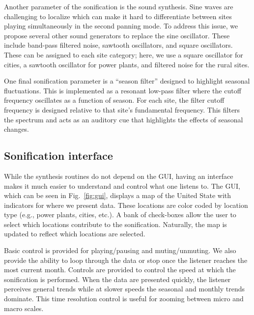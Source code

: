 \documentclass[a4paper,10pt,oneside]{article}
\newcommand{\ce}[1]{$\mathrm{#1}$}
\begin{document}
\begin{sloppy}
Another parameter of the sonification is the sound synthesis. Sine waves are challenging to localize which can make it hard to differentiate between sites playing simultaneously in the second panning mode. To address this issue, we propose several other sound generators to replace the sine oscillator. These include band-pass filtered noise, sawtooth oscillators, and square oscillators. These can be assigned to each site category; here, we use a square oscillator for cities, a sawtooth oscillator for power plants, and filtered noise for the rural sites. 

One final sonification parameter is a ``season filter'' designed to highlight seasonal fluctuations. This is implemented as a resonant low-pass filter where the cutoff frequency oscillates as a function of season. For each site, the filter cutoff frequency is designed relative to that site's fundamental frequency.  This filters the spectrum and acts as an auditory cue that highlights the effects of seasonal changes. 






\subsection{Sonification interface}

While the synthesis routines do not depend on the GUI, having an interface makes it much easier to understand and control what one listens to. The GUI, which can be seen in Fig.~\ref{fig:gui}, displays a map of the United State with indicators for where we present data.  These locations are color coded by location type (e.g., power plants, cities, etc.). A bank of check-boxes allow the user to select which locations contribute to the sonification. Naturally, the map is updated to reflect which locations are selected.  


Basic control is provided for playing/pausing and muting/unmuting. We also provide the ability to loop through the data or stop once the listener reaches the most current month.  Controls are provided to control the speed at which the sonification is performed.  When the data are presented quickly, the listener perceives general trends while at slower speeds the seasonal and monthly trends dominate.  This time resolution control is useful for zooming between micro and macro scales.  


\end{sloppy}
\end{document}
